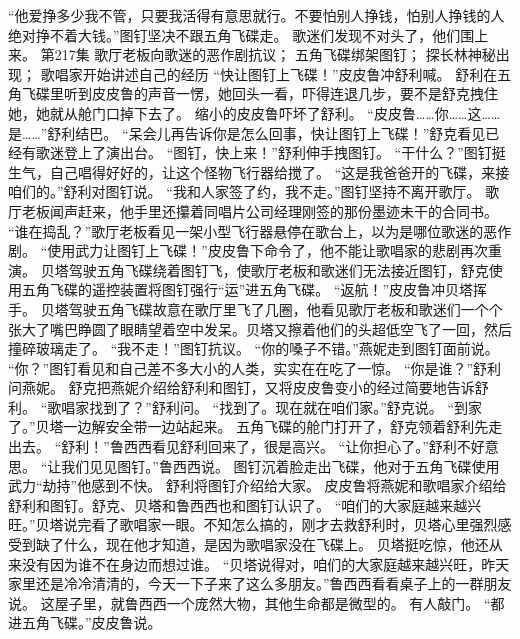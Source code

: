 \documentclass[a4paper,12pt,UTF8,twoside]{ctexbook}
\begin{document}
        “他爱挣多少我不管，只要我活得有意思就行。不要怕别人挣钱，怕别人挣钱的人绝对挣不着大钱。”图钉坚决不跟五角飞碟走。 
        歌迷们发现不对头了，他们围上来。   第217集 
        歌厅老板向歌迷的恶作剧抗议； 
        五角飞碟绑架图钉； 
        探长林神秘出现； 
        歌唱家开始讲述自己的经历   
        “快让图钉上飞碟！”皮皮鲁冲舒利喊。 
        舒利在五角飞碟里听到皮皮鲁的声音一愣，她回头一看，吓得连退几步，要不是舒克拽住她，她就从舱门口掉下去了。 
        缩小的皮皮鲁吓坏了舒利。 
        “皮皮鲁……你……这……是……”舒利结巴。 
        “呆会儿再告诉你是怎么回事，快让图钉上飞碟！”舒克看见已经有歌迷登上了演出台。 
        “图钉，快上来！”舒利伸手拽图钉。 
        “干什么？”图钉挺生气，自己唱得好好的，让这个怪物飞行器给搅了。 
        “这是我爸爸开的飞碟，来接咱们的。”舒利对图钉说。 
        “我和人家签了约，我不走。”图钉坚持不离开歌厅。 
        歌厅老板闻声赶来，他手里还攥着同唱片公司经理刚签的那份墨迹未干的合同书。 
        “谁在捣乱？”歌厅老板看见一架小型飞行器悬停在歌台上，以为是哪位歌迷的恶作剧。 
        “使用武力让图钉上飞碟！”皮皮鲁下命令了，他不能让歌唱家的悲剧再次重演。 
        贝塔驾驶五角飞碟绕着图钉飞，使歌厅老板和歌迷们无法接近图钉，舒克使用五角飞碟的遥控装置将图钉强行“运”进五角飞碟。 
        “返航！”皮皮鲁冲贝塔挥手。 
        贝塔驾驶五角飞碟故意在歌厅里飞了几圈，他看见歌厅老板和歌迷们一个个张大了嘴巴睁圆了眼睛望着空中发呆。贝塔又擦着他们的头超低空飞了一回，然后撞碎玻璃走了。 
        “我不走！”图钉抗议。 
        “你的嗓子不错。”燕妮走到图钉面前说。 
        “你？”图钉看见和自己差不多大小的人类，实实在在吃了一惊。 
        “你是谁？”舒利问燕妮。 
        舒克把燕妮介绍给舒利和图钉，又将皮皮鲁变小的经过简要地告诉舒利。 
        “歌唱家找到了？”舒利问。 
        “找到了。现在就在咱们家。”舒克说。 
        “到家了。”贝塔一边解安全带一边站起来。 
        五角飞碟的舱门打开了，舒克领着舒利先走出去。 
        “舒利！”鲁西西看见舒利回来了，很是高兴。 
        “让你担心了。”舒利不好意思。 
        “让我们见见图钉。”鲁西西说。 
        图钉沉着脸走出飞碟，他对于五角飞碟使用武力“劫持”他感到不快。 
        舒利将图钉介绍给大家。 
        皮皮鲁将燕妮和歌唱家介绍给舒利和图钉。舒克、贝塔和鲁西西也和图钉认识了。 
        “咱们的大家庭越来越兴旺。”贝塔说完看了歌唱家一眼。不知怎么搞的，刚才去救舒利时，贝塔心里强烈感受到缺了什么，现在他才知道，是因为歌唱家没在飞碟上。 
        贝塔挺吃惊，他还从来没有因为谁不在身边而想过谁。 
        “贝塔说得对，咱们的大家庭越来越兴旺，昨天家里还是冷冷清清的，今天一下子来了这么多朋友。”鲁西西看看桌子上的一群朋友说。 
        这屋子里，就鲁西西一个庞然大物，其他生命都是微型的。 
        有人敲门。 
        “都进五角飞碟。”皮皮鲁说。 
\end{document}
